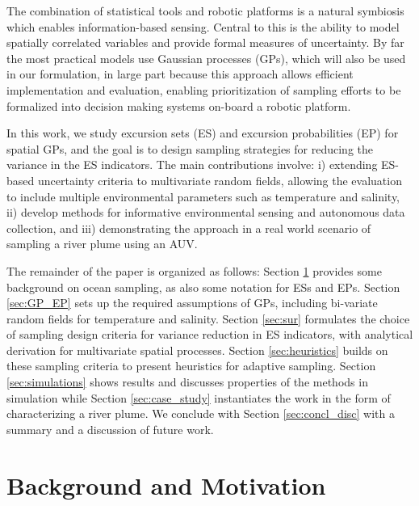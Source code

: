 \documentclass[aoas]{imsart}
\begin{document}
The combination of statistical tools and robotic platforms is a natural
symbiosis which enables information-based sensing. Central to this is
the ability to model spatially correlated variables and provide formal
measures of uncertainty. By far the most practical models use Gaussian
processes (GPs), which will also be used in our formulation, in large
part because this approach allows efficient implementation and evaluation, enabling prioritization of
sampling efforts to be formalized into decision making systems on-board
a robotic platform.

In this work, we study excursion sets (ES) and excursion probabilities
(EP) for spatial GPs, and the goal is to design sampling strategies for
reducing the variance in the ES indicators. The main contributions involve: i)
extending ES-based uncertainty criteria to multivariate random fields,
allowing the evaluation to include multiple environmental parameters
such as temperature and salinity, ii) develop methods for informative
environmental sensing and autonomous data collection, and iii)
demonstrating the approach in a real world scenario of sampling a river
plume using an AUV.

The remainder of the paper is organized as follows: Section \ref{sec:bg}
provides some background on ocean sampling, as also some notation for
ESs and EPs. Section \ref{sec:GP_EP} sets up the required assumptions of
GPs, including bi-variate random fields for temperature and salinity.
Section \ref{sec:sur} formulates the choice of sampling design criteria for
variance reduction in ES indicators, with analytical derivation for multivariate
spatial processes. Section \ref{sec:heuristics} builds on these sampling
criteria to present heuristics for adaptive sampling. Section
\ref{sec:simulations} shows results and discusses properties of the
methods in simulation while Section \ref{sec:case_study} instantiates
the work in the form of characterizing a river plume. We conclude with
Section \ref{sec:concl_disc} with a summary and a discussion of future
work.


\section{Background and Motivation}\label{sec:bg}
\end{document}
